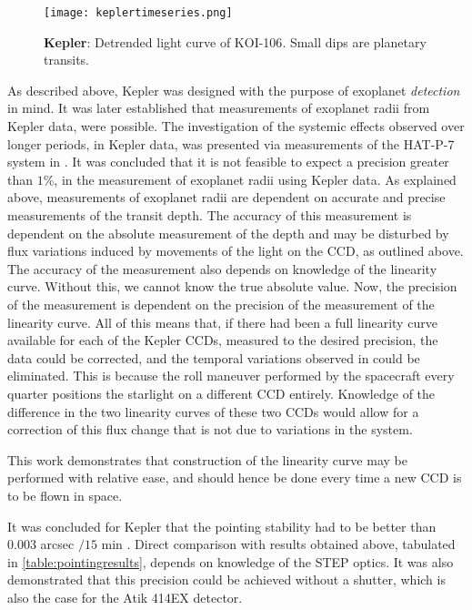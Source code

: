 \documentclass[../main.tex]{subfiles}
\begin{document}
\begin{figure}
	\centering
	\texttt{[image: keplertimeseries.png]}
	\caption{\textbf{Kepler}: Detrended light curve of KOI-106\cite{keplertimeseriessource}. Small dips are planetary transits.}
	\label{fig:keplertimeseries}
\end{figure}

As described above, Kepler was designed with the purpose of exoplanet \textit{detection} in mind. It was later established that measurements of exoplanet radii from Kepler data, were possible. The investigation of the systemic effects observed over longer periods, in Kepler data, was presented via measurements of the HAT-P-7 system in \cite{hatp7}. It was concluded that it is not feasible to expect a precision greater than $1\%$, in the measurement of exoplanet radii using Kepler data. As explained above, measurements of exoplanet radii are dependent on accurate and precise measurements of the transit depth. The accuracy of this measurement is dependent on the absolute measurement of the depth and may be disturbed by flux variations induced by movements of the light on the CCD, as outlined above. The accuracy of the measurement also depends on knowledge of the linearity curve. Without this, we cannot know the true absolute value. Now, the precision of the measurement is dependent on the precision of the measurement of the linearity curve. All of this means that, if there had been a full linearity curve available for each of the Kepler CCDs, measured to the desired precision, the data could be corrected, and the temporal variations observed in \cite{hatp7} could be eliminated. This is because the roll maneuver performed by the spacecraft every quarter positions the starlight on a different CCD entirely. Knowledge of the difference in the two linearity curves of these two CCDs would allow for a correction of this flux change that is not due to variations in the system. 

This work demonstrates that construction of the linearity curve may be performed with relative ease, and should hence be done every time a new CCD is to be flown in space.

It was concluded for Kepler that the pointing stability had to be better than $0.003$ arcsec  $/15$ min \cite{keplermissionreq}. Direct comparison with results obtained above, tabulated in \ref{table:pointingresults}, depends on knowledge of the STEP optics. It was also demonstrated that this precision could be achieved without a shutter, which is also the case for the Atik 414EX detector. 
\end{document}
